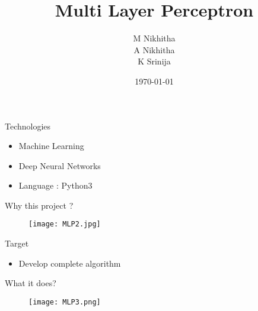 \documentclass{beamer}
\title{Multi Layer Perceptron }
\author{ M Nikhitha \\ A Nikhitha \\ K Srinija}
\institute[WE]{ TalentSprint - WE program }
\date{\today}
\begin{document}
\begin{frame}
  \titlepage
\end{frame}


\begin{frame}{Technologies}
\begin{itemize}
  \item Machine Learning
  \item Deep Neural Networks
  \item Language : Python3
\end{itemize}
\end{frame}

\begin{frame}{Why this project ?}
\begin{figure}
    \texttt{[image: MLP2.jpg]}
\end{figure}
\end{frame}

\begin{frame}{Target}
\begin{itemize}
  \item Develop complete algorithm 
\end{itemize}
\end{frame}

\begin{frame}{What it does?}
\begin{figure}
    \texttt{[image: MLP3.png]}
\end{figure}
\end{frame}

    
    
\end{document}

